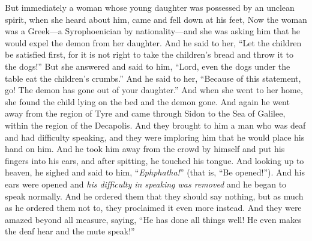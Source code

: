 \begin{biblechapter}
\verse But immediately a woman whose young daughter was possessed by an unclean spirit, when she heard about him, came and fell down at his feet,
\verse Now the woman was a Greek—a Syrophoenician by nationality—and she was asking him that he would expel the demon from her daughter.
\verse And he said to her, “Let the children be satisfied first, for it is not right to take the children’s bread and throw it to the dogs!”
\verse But she answered and said to him, “Lord, even the dogs under the table eat the children’s crumbs.”
\verse And he said to her, “Because of this statement, go! The demon has gone out of your daughter.”
\verse And when she went to her home, she found the child lying on the bed and the demon gone.
 And again he went away from the region of Tyre and came through Sidon to the Sea of Galilee, within the region of the Decapolis.
\verse And they brought to him a man who was deaf and had difficulty speaking, and they were imploring him that he would place his hand on him.
\verse And he took him away from the crowd by himself and put his fingers into his ears, and after spitting, he touched his tongue.
\verse And looking up to heaven, he sighed and said to him, “\textit{Ephphatha!}” (that is, “Be opened!”).
\verse And his ears were opened and \textit{his difficulty in speaking was removed} and he began to speak normally.
\verse And he ordered them that they should say nothing, but as much as he ordered them not to, they proclaimed it even more instead.
\verse And they were amazed beyond all measure, saying, “He has done all things well! He even makes the deaf hear and the mute speak!”
\end{biblechapter}

